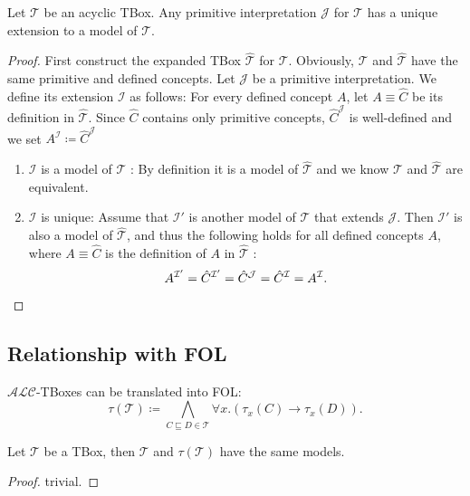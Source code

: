 \begin{corollary}
	Let $\mathcal{T}$ be an acyclic TBox.
	Any primitive interpretation $\mathcal{J}$ for $\mathcal{T}$ has a unique extension to a model of $\mathcal{T}$.
\end{corollary}
\begin{proof}
	First construct the expanded TBox $\widehat{\mathcal{T}}$ for $\mathcal{T}$.
	Obviously, $\mathcal{T}$ and $\widehat{\mathcal{T}}$ have the same primitive and defined concepts.
	Let $\mathcal{J}$ be a primitive interpretation.
	We define its extension $\mathcal{I}$ as follows:
	For every defined concept $A$, let $A \equiv \hat{C}$ be its definition in $\widehat{\mathcal{T}}$.
	Since $\hat{C}$ contains only primitive concepts, $\hat{C}^{\mathcal{J}}$ is well-defined and we set $A^{\mathcal{I}} \coloneqq \hat{C}^{\mathcal{J}}$
	\begin{enumerate}
		\item $\mathcal{I}$ is a model of $\mathcal{T}$ : \newline
			By definition it is a model of $\widehat{\mathcal{T}}$ and we know $\mathcal{T}$ and $\widehat{\mathcal{T}}$ are equivalent.
		\item $\mathcal{I}$ is unique: \newline
			Assume that $\mathcal{I}'$ is another model of $\mathcal{T}$ that extends $\mathcal{J}$.
			Then $\mathcal{I}'$ is also a model of $\widehat{\mathcal{T}}$, and thus the following holds for all defined concepts $A$,
			where $A \equiv \hat{C}$ is the definition of $A$ in $\widehat{\mathcal{T}}$ :
			\[
				A^{\mathcal{I}'} = \hat{C}^{\mathcal{I}'} = \hat{C}^{\mathcal{J}} = \hat{C}^{\mathcal{I}} = A^{\mathcal{I}}
			. \qedhere \]
	\end{enumerate}
\end{proof}

\subsection*{Relationship with FOL}
$\mathcal{ALC}$-TBoxes can be translated into FOL:
\[
	\tau(\mathcal{T}) \coloneqq \bigwedge_{C \sqsubseteq D \in \mathcal{T}} \forall x.\left( \tau_x(C) \rightarrow \tau_x(D) \right)
.\]

\begin{lemma}
	Let $\mathcal{T}$ be a TBox, then $\mathcal{T}$ and $\tau(\mathcal{T})$ have the same models.
\end{lemma}
\begin{proof}
	trivial.
\end{proof}

